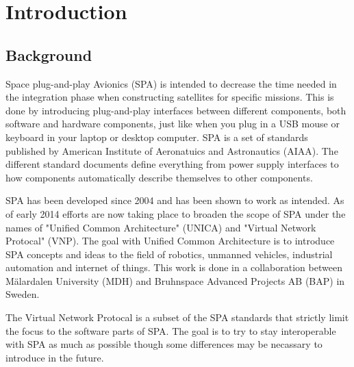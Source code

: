 \chapter{Introduction}

\section{Background}


Space plug-and-play Avionics (SPA) is intended to decrease the time needed in
the integration phase when constructing satellites for specific missions. This
is done by introducing plug-and-play interfaces between different components,
both software and hardware components, just like when you plug in a USB mouse
or keyboard in your laptop or desktop computer. SPA is a set of standards
published by American Institute of Aeronatuics and Astronautics (AIAA). The
different standard documents define everything from power supply interfaces to
how components automatically describe themselves to other components.


SPA has been developed since 2004 and has been shown to work as intended. As of
early 2014 efforts are now taking place to broaden the scope of SPA under the
names of "Unified Common Architecture" (UNICA) and "Virtual Network Protocal"
(VNP). The goal with Unified Common Architecture is to introduce SPA concepts
and ideas to the field of robotics, unmanned vehicles, industrial automation
and internet of things. This work is done in a collaboration between
M\"{a}lardalen University (MDH) and Bruhnspace Advanced Projects AB (BAP) in
Sweden.


The Virtual Network Protocal is a subset of the SPA standards that
strictly limit the focus to the software parts of SPA. The goal is to try to
stay interoperable with SPA as much as possible though some differences may be
necassary to introduce in the future.

